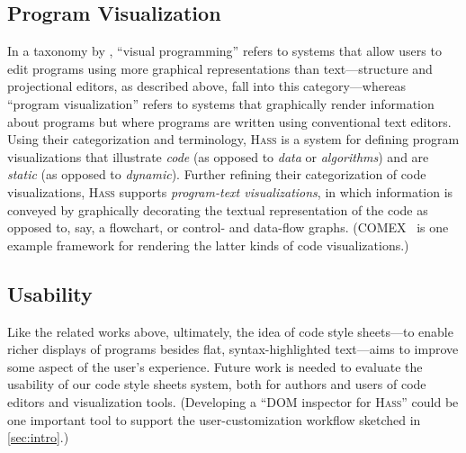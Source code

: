 \documentclass[acmsmall, screen]{acmart}
\newcommand{\hass}
{\textsc{Hass}}
\begin{document}
\subsection{Program Visualization}



In a taxonomy by \citet{VPandPV}, ``visual programming'' refers to systems that allow users to edit programs using more graphical representations than text---structure and projectional editors, as described above, fall into this category---whereas ``program visualization'' refers to systems that graphically render information about programs but where programs are written using conventional text editors.
Using their categorization and terminology, \hass{} is a system for defining program visualizations that illustrate \emph{code} (as opposed to \emph{data} or \emph{algorithms}) and are \emph{static} (as opposed to \emph{dynamic}).
Further refining their categorization of code visualizations, \hass{} supports \emph{program-text visualizations}, in which information is conveyed by graphically decorating the textual representation of the code as opposed to, say, a flowchart, or control- and data-flow graphs.
(COMEX~\cite{COMEX} is one example framework for rendering the latter kinds of code visualizations.)




\subsection{Usability}

Like the related works above, ultimately, the idea of code style sheets---to enable richer displays of programs besides flat, syntax-highlighted text---aims to improve some aspect of the user's experience.
Future work is needed to evaluate the usability of our code style sheets system, both for authors and users of code editors and visualization tools.
(Developing a ``DOM inspector for \hass{}'' could be one important tool to support the user-customization workflow sketched in \autoref{sec:intro}.)
\end{document}
